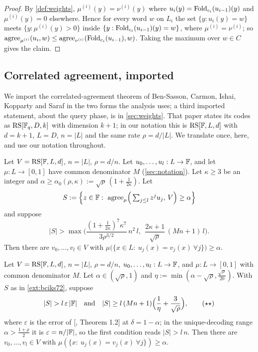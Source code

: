 \begin{proof}
By \cref{def:weights}, $\mu^{(i)}(y)=\nu^{(i)}(y)$ where $u_i(y)=\mathrm{Fold}_{c_i}(u_{i-1})(y)$ and
$\mu^{(i)}(y)=0$ elsewhere. Hence for every word $w$ on $L_i$ the set $\{y:u_i(y)=w\}$ meets
$\{y:\mu^{(i)}(y)>0\}$ inside $\{y:\mathrm{Fold}_{c_i}(u_{i-1})(y)=w\}$, where $\mu^{(i)}=\nu^{(i)}$; so
$\mathrm{agree}_{\mu^{(i)}}(u_i,w)\le\mathrm{agree}_{\nu^{(i)}}(\mathrm{Fold}_{c_i}(u_{i-1}),w)$. Taking the maximum over
$w\in C$ gives the claim.
\end{proof}

\subsection{Correlated agreement, imported}\label{sec:imported}

We import the correlated-agreement theorem of Ben-Sasson, Carmon, Ishai, Kopparty and Saraf
\cite{BCIKS20} in the two forms the analysis uses; a third imported statement, about the query
phase, is in \cref{sec:weights}. That paper states its codes as $\mathrm{RS}[\mathbb{F}_q,D,k]$ with dimension
$k+1$; in our notation this is $\mathrm{RS}[\mathbb{F},L,d]$ with $d=k+1$, $L=D$, $n=|L|$ and the same rate
$\rho=d/|L|$. We translate once, here, and use our notation throughout.

\begin{importedthm}\label{ext:bciks72}
Let $V=\mathrm{RS}[\mathbb{F},L,d]$, $n=|L|$, $\rho=d/n$. Let $u_0,\dots,u_l:L\to\mathbb{F}$, and let $\mu:L\to[0,1]$
have common denominator $M$ (\cref{sec:notation}). Let $\kappa\ge3$ be an integer and
$\alpha\ge\alpha_0(\rho,\kappa):=\sqrt\rho\,(1+\tfrac1{2\kappa})$. Let
\[
S:=\Big\{z\in\F:\ \agree_\mu\Big(\textstyle\sum_{j\le l}z^ju_j,\,V\Big)\ge\alpha\Big\}
\]
and suppose
\[
|S|>\max\Big(\frac{(1+\frac1{2\kappa})^7\kappa^7}{3\rho^{3/2}}\,n^2\,l,\ \
\frac{2\kappa+1}{\sqrt\rho}\,(Mn+1)\,l\Big).\tag{$\star$}
\]
Then there are $v_0,\dots,v_l\in V$ with
$\mu\big(\{x\in L:\ u_j(x)=v_j(x)\ \forall j\}\big)\ge\alpha$.
\end{importedthm}

\begin{importedthm}\label{ext:bciks71}
Let $V=\mathrm{RS}[\mathbb{F},L,d]$, $n=|L|$, $\rho=d/n$, $u_0,\dots,u_l:L\to\mathbb{F}$, and $\mu:L\to[0,1]$ with
common denominator $M$. Let $\alpha\in(\sqrt\rho,1)$ and $\eta:=\min(\alpha-\sqrt\rho,\frac{\sqrt\rho}{20})$.
With $S$ as in \cref{ext:bciks72}, suppose
\[
|S|>l\,\varepsilon\,|\F|\quad\text{and}\quad|S|\ge l\,(Mn+1)\Big(\frac1\eta+\frac3{\sqrt\rho}\Big),\tag{$\star\star$}
\]
where $\varepsilon$ is the error of [\cite{BCIKS20}, Theorem 1.2] at $\delta=1-\alpha$; in the
unique-decoding range $\alpha>\frac{1+\rho}2$ it is $\varepsilon=n/|\mathbb{F}|$, so the first condition
reads $|S|>l\,n$. Then there are $v_0,\dots,v_l\in V$ with
$\mu(\{x:\ u_j(x)=v_j(x)\ \forall j\})\ge\alpha$.
\end{importedthm}

